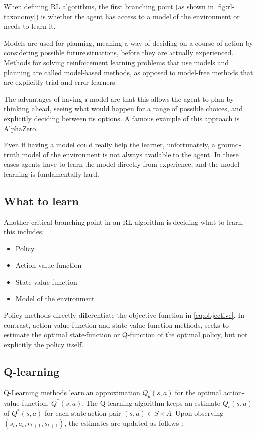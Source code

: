 \documentclass{article}
\begin{document}
When defining RL algorithms, the first branching point (as shown in \autoref{fig:rl-taxonomy}) is whether the agent has access to a model of the environment or needs to learn it.

Models are used for planning, meaning a way of deciding on a course of action by considering possible future situations, before they are actually experienced. Methods for solving reinforcement learning problems that use models and planning are called model-based methods, as opposed to model-free methods that are explicitly trial-and-error learners.

The advantages of having a model are that this allows the agent to plan by thinking ahead, seeing what would happen for a range of possible choices, and explicitly deciding between its options. A famous example of this approach is AlphaZero. \cite{silver2017mastering}

Even if having a model could really help the learner, unfortunately, a ground-truth model of the environment is not always available to the agent. In these cases agents have to learn the model directly from experience, and the model-learning is fundamentally hard.

\subsection{What to learn}

Another critical branching point in an RL algorithm is deciding what to learn, this includes:
\begin{itemize}
	\item Policy
	\item Action-value function
	\item State-value function
	\item Model of the environment
\end{itemize}

Policy methods directly differentiate the objective function in \autoref{eq:objective}. In contrast, action-value function and state-value function methods, seeks to estimate the optimal state-function or Q-function of the optimal policy, but not explicitly the policy itself.


\subsection{Q-learning}


Q-Learning methods learn an approximation $Q_{\theta}(s,a)$ for the optimal action-value function, $Q^*(s,a)$. The Q-learning algorithm keeps an estimate $Q_t(s,a)$ of $Q^*(s,a)$ for each state-action pair $(s,a) \in S \times A$. Upon observing $(s_t, a_t, r_{t+1}, s_{t+1})$, the estimates are updated as follows \cite{series/synthesis/2010Szepesvari}:
\end{document}
